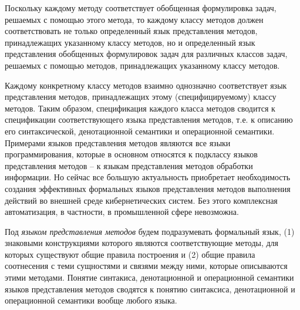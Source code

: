 \begin{SCn}
\begin{scnindent}
\end{scnindent}
\begin{scnindent}
\end{scnindent}
\end{SCn}

Поскольку каждому методу соответствует обобщенная формулировка задач, решаемых с помощью этого метода, то каждому классу
методов должен соответствовать не только определенный язык представления методов, принадлежащих указанному классу
методов, но и определенный язык представления обобщенных формулировок задач для различных классов задач, решаемых с
помощью методов, принадлежащих указанному классу методов.

Каждому конкретному классу методов взаимно однозначно соответствует язык представления методов, принадлежащих этому
(специфицируемому) классу методов. Таким образом, спецификация каждого класса методов сводится к спецификации
соответствующего языка представления методов, т.е. к описанию его синтаксической, денотационной семантики и операционной
семантики. Примерами языков представления методов являются все языки программирования, которые в основном относятся к
подклассу языков представления методов – к языкам представления методов обработки информации. Но сейчас все большую
актуальность приобретает необходимость создания эффективных формальных языков представления методов выполнения действий
во внешней среде кибернетических систем. Без этого комплексная автоматизация, в частности, в промышленной сфере
невозможна.

Под \textit{языком представления методов} будем подразумевать формальный язык, (1) знаковыми конструкциями которого
являются соответствующие методы, для которых существуют общие правила построения и (2) общие правила соотнесения с теми
сущностями и связями между ними, которые описываются этими методами. Понятие синтакиса, денотационной и операционной
семантики языков представления методов сводятся к понятию синтаксиса, денотационной и операционной семантики вообще
любого языка.

